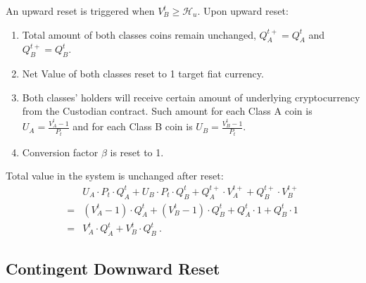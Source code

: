 \documentclass[final,pdftex]{ectaart}
\theoremstyle{plain}
\begin{document}
\begin{appendices}
An upward reset is triggered when $V_{B}^{t}\geqslant\mathcal{H}_{u}$. Upon upward reset:
\begin{enumerate}
\item Total amount of both classes coins remain unchanged, $Q_{A}^{t+}=Q_{A}^{t}$ and $Q_{B}^{t+}=Q_{B}^{t}$.
\item Net Value of both classes reset to 1 target fiat currency.
\item Both classes' holders will receive certain amount of underlying cryptocurrency from the Custodian contract. Such amount for each Class A coin is $U_{A}=\frac{V_{A}^{t}-1}{P_{t}}$ and for each Class B coin is $U_{B}=\frac{V_{B}^{t}-1}{P_{t}}$.
\item Conversion factor $\beta$ is reset to 1.
\end{enumerate}
Total value in the system is unchanged after reset:
\begin{align*}
 & U_{A}\cdot P_{t}\cdot Q_{A}^{t}+U_{B}\cdot P_{t}\cdot Q_{B}^{t}+Q_{A}^{t+}\cdot V_{A}^{t+}+Q_{B}^{t+}\cdot V_{B}^{t+}\\
= & \left(V_{A}^{t}-1\right)\cdot Q_{A}^{t}+\left(V_{B}^{t}-1\right)\cdot Q_{B}^{t}+Q_{A}^{t}\cdot1+Q_{B}^{t}\cdot1\\
= & V_{A}^{t}\cdot Q_{A}^{t}+V_{B}^{t}\cdot Q_{B}^{t}\ .
\end{align*}

\subsection{Contingent Downward Reset\label{subsec:Contingent-Downward-Reset}}


\end{appendices}
\end{document}
